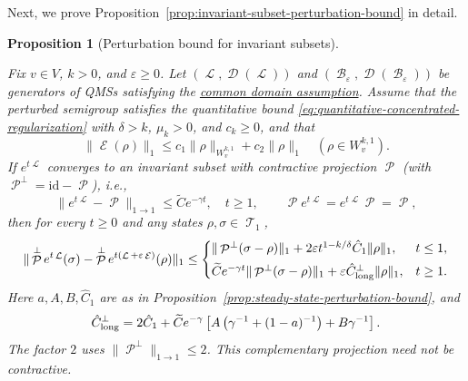 \documentclass[11pt]{article}
\theoremstyle{myplain}
\newtheorem{prop}[prop]{Proposition}
\theoremstyle{mydefinition}
\theoremstyle{remark}
\DeclareMathOperator{\cB}{\mathcal{B}}
\DeclareMathOperator{\cD}{\mathcal{D}}
\DeclareMathOperator{\cE}{\mathcal{E}}
\DeclareMathOperator{\cL}{\mathcal{L}}
\DeclareMathOperator{\cP}{\mathcal{P}}
\DeclareMathOperator{\cT}{\mathcal{T}}
\DeclareMathOperator{\1}{\mathds{1}}
\begin{document}
    Next, we prove Proposition~\ref{prop:invariant-subset-perturbation-bound} in detail.
    \begin{prop}[Perturbation bound for invariant subsets]\label{appx-prop:invariant-subset-perturbation-bound}
        
        Fix $v \in V$, $k > 0$, and $\varepsilon \ge 0$. Let $(\cL,\cD(\cL))$ and $(\cB_\varepsilon,\cD(\cB_\varepsilon))$ be generators of QMSs satisfying the \hyperref[assum:perturbation-common-domain]{common domain assumption}. Assume that the perturbed semigroup satisfies the quantitative bound \eqref{eq:quantitative-concentrated-regularization} with $\delta>k$, $\mu_k>0$, and $c_k\geq0$, and that
        \begin{equation*}
            \|\cE(\rho)\|_1\leq c_1\|\rho\|_{W_v^{k,1}}+c_2\|\rho\|_1
            \quad(\rho\in W_v^{k,1}).
        \end{equation*}
        If $e^{t\cL}$ converges to an invariant subset with contractive projection $\cP$ (with $\cP^\perp=\mathrm{id}-\cP$), i.e.,
        \begin{equation*}
            \|e^{t\cL}-\cP\|_{1\to1}\leq\widetilde C e^{-\gamma t},\quad t\geq1,
            \qquad \cP e^{t\cL}=e^{t\cL}\cP=\cP,
        \end{equation*}
        then for every $t \ge 0$ and any states $\rho,\sigma\in\cT_1$,
        \begin{equation*}
            \begin{aligned}
                \|\cP^\perp e^{t\cL}(\sigma)-\cP^\perp e^{t(\cL+\varepsilon\cE)}(\rho)\|_1
                \leq
                \begin{cases}
                    \|\cP^\perp(\sigma-\rho)\|_1+2\varepsilon t^{1-k/\delta}\hat C_1\|\rho\|_1,&t\leq1,\\[4pt]
                    \widetilde C e^{-\gamma t}\|\cP^\perp(\sigma-\rho)\|_1+
                    \varepsilon\hat C_{\rm long}^\perp\|\rho\|_1,&t\geq1.
                \end{cases}
            \end{aligned}
        \end{equation*}
        Here $a,A,B,\hat C_1$ are as in Proposition~\ref{prop:steady-state-perturbation-bound}, and
        \begin{equation*}
            \hat C_{\rm long}^{\perp}=2\hat C_1+\widetilde C e^{-\gamma}
            \left[A\left(\gamma^{-1}+(1-a)^{-1}\right)+B\gamma^{-1}\right].
        \end{equation*}
        The factor $2$ uses $\|\cP^\perp\|_{1\to1}\leq2$. This complementary projection need not be contractive.
        
    \end{prop}
\end{document}
